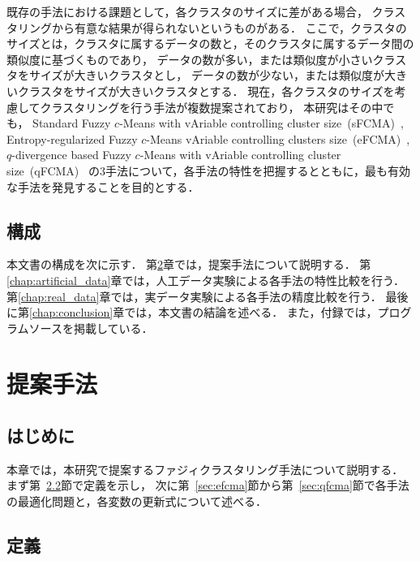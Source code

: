\documentclass[a4j,12pt,dvipdfmx,oneside]{jsbook}
\theoremstyle{definition}
\begin{document}
 既存の手法における課題として，各クラスタのサイズに差がある場合，
 クラスタリングから有意な結果が得られないというものがある．
 ここで，クラスタのサイズとは，クラスタに属するデータの数と，そのクラスタに属するデータ間の類似度に基づくものであり，
 データの数が多い，または類似度が小さいクラスタをサイズが大きいクラスタとし，
 データの数が少ない，または類似度が大きいクラスタをサイズが大きいクラスタとする．
 現在，各クラスタのサイズを考慮してクラスタリングを行う手法が複数提案されており，
 本研究はその中でも，
 Standard Fuzzy $c$-Means with vAriable controlling cluster size~(sFCMA)~\cite{sFCMA},
 Entropy-regularized Fuzzy $c$-Means vAriable controlling clusters size~(eFCMA)~\cite{eFCMA},
 $q$-divergence based Fuzzy $c$-Means with vAriable controlling cluster size~(qFCMA)~\cite{qFCMA}
 の$3$手法について，各手法の特性を把握するとともに，最も有効な手法を発見することを目的とする．

 \section{構成}\label{sec:contents}
 本文書の構成を次に示す．
 第\ref{chap:suggest_method}章では，提案手法について説明する．
 第\ref{chap:artificial_data}章では，人工データ実験による各手法の特性比較を行う．
 第\ref{chap:real_data}章では，実データ実験による各手法の精度比較を行う．
 最後に第\ref{chap:conclusion}章では，本文書の結論を述べる．
 また，付録では，プログラムソースを掲載している．

\chapter{提案手法}\label{chap:suggest_method}

 \section{はじめに}\label{sec:suggest_method_intro}
 本章では，本研究で提案するファジィクラスタリング手法について説明する．
 まず第~\ref{sec:suggest_method_define}節で定義を示し，
 次に第~\ref{sec:efcma}節から第~\ref{sec:qfcma}節で各手法の最適化問題と，各変数の更新式について述べる．
 
 \section{定義}\label{sec:suggest_method_define}
 
\end{document}
